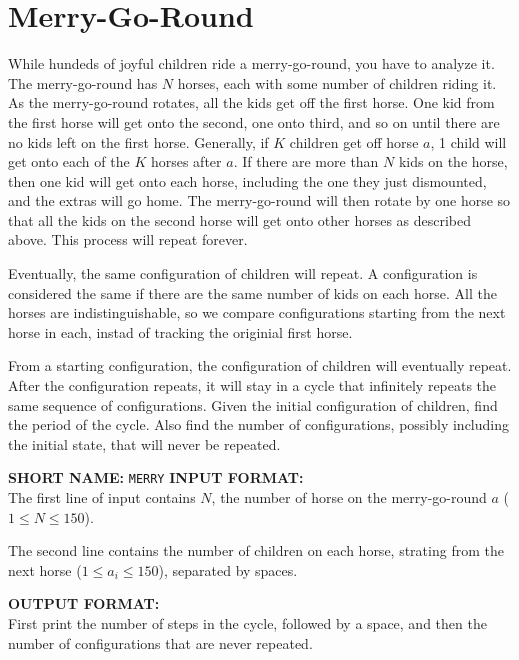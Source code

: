 \documentclass[twoside]{article}
\newcommand{\blank}{\vskip 3mm}
\begin{document}



\section{Merry-Go-Round}

While hundeds of joyful children ride a merry-go-round, you have to analyze it. The merry-go-round has  $N$ horses, each with some number of children riding it.  As the merry-go-round rotates, all the kids get off the first horse.  One kid from the first horse will get onto the second, one onto third, and so on until there are no kids left on the first horse.  Generally, if $K$ children get off horse $a$, 1 child will get onto each of the $K$ horses after $a$.  If there are more than $N$ kids on the horse, then one kid will get onto each horse, including the one they just dismounted, and the extras will go home.   The merry-go-round will then rotate by one horse so that all the kids on the second horse will get onto other horses as described above. This process will repeat forever.

Eventually, the same configuration of children will repeat.  A configuration is considered the same if there are the same number of kids on each horse.  All the horses are indistinguishable, so we compare configurations starting from the next horse in each, instad of tracking the originial first horse.

From a starting configuration, the configuration of children will eventually repeat.  After the configuration repeats, it will stay in a cycle that infinitely repeats the same sequence of configurations.  Given the initial configuration of children, find the period of the cycle.  Also find the number of configurations, possibly including the initial state, that will never be repeated.  


\textbf{SHORT NAME:} \verb|MERRY|
\blank
\textbf{INPUT FORMAT:}\\
The first line of input contains $N$, the number of horse on the merry-go-round $a$ ($1 \leq N \leq 150$).

The second line contains the number of children on each horse, strating from the next horse ($1 \leq a_i \leq 150$), separated by spaces.


\blank
\textbf{OUTPUT FORMAT:}\\
First print the number of steps in the cycle, followed by a space, and then the number of configurations that are never repeated.
\end{document}
